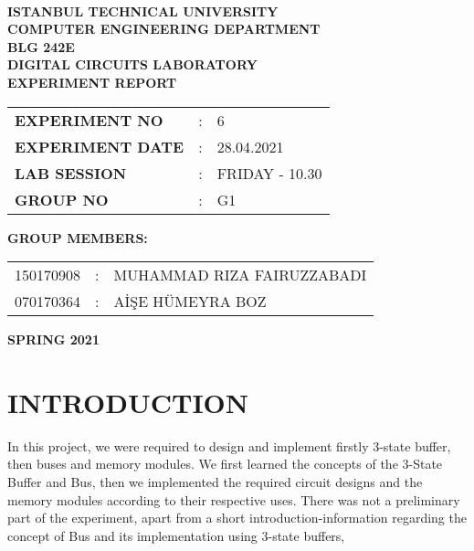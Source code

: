 \documentclass[pdftex,12pt,a4paper]{article}
\begin{document}
\begin{titlepage}
\begin{center}
\textbf{}\\
\textbf{\Large{ISTANBUL TECHNICAL UNIVERSITY}}\\
\vspace{0.5cm}
\textbf{\Large{COMPUTER ENGINEERING DEPARTMENT}}\\
\vspace{2cm}
\textbf{\Large{BLG 242E\\ DIGITAL CIRCUITS LABORATORY\\ EXPERIMENT REPORT}}\\
\vspace{2.8cm}
\begin{table}[ht]
\centering
\Large{
\begin{tabular}{lcl}
\textbf{EXPERIMENT NO}  & : & 6 \\
\textbf{EXPERIMENT DATE}  & : & 28.04.2021 \\
\textbf{LAB SESSION}  & : & FRIDAY - 10.30 \\
\textbf{GROUP NO}  & : & G1 \\
\end{tabular}}
\end{table}
\vspace{1cm}
\textbf{\Large{GROUP MEMBERS:}}\\
\begin{table}[ht]
\centering
\Large{
\begin{tabular}{rcl}
150170908  & : & MUHAMMAD RIZA FAIRUZZABADI \\
070170364  & : & AİŞE HÜMEYRA BOZ \\
\end{tabular}}
\end{table}
\vspace{2.8cm}
\textbf{\Large{SPRING 2021}}

\end{center}

\end{titlepage}

\thispagestyle{empty}
\setcounter{tocdepth}{4}
\tableofcontents
\clearpage

\setcounter{page}{1}






\section{INTRODUCTION}
In this project, we were required to design and implement firstly 3-state buffer, then buses and memory modules. We first learned the concepts of the 3-State Buffer and Bus, then we implemented the required circuit designs and the memory modules according to their respective uses. There was not a preliminary part of the experiment, apart from a short introduction-information regarding the concept of Bus and its implementation using 3-state buffers,
\end{document}
